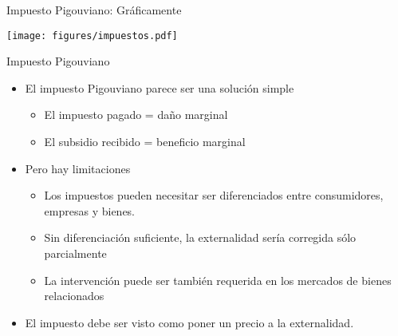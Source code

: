 \begin{frame}{Impuesto Pigouviano: Gráficamente}
	\begin{center}
		\texttt{[image: figures/impuestos.pdf]}
	\end{center}
\end{frame}
\begin{frame}{Impuesto Pigouviano}
	\begin{itemize}
		\item El impuesto Pigouviano parece ser una solución simple
				\begin{itemize}
					\item El impuesto pagado = daño marginal
					\item El subsidio recibido = beneficio marginal
				\end{itemize}
		\item Pero hay limitaciones
				\begin{itemize}
					\item Los impuestos pueden necesitar ser diferenciados entre consumidores, empresas y bienes.
					\item Sin diferenciación suficiente, la externalidad sería corregida sólo parcialmente
					\item La intervención puede ser también requerida en los mercados de bienes relacionados
				\end{itemize}
		\item El impuesto debe ser visto como poner un precio a la externalidad.
	\end{itemize}
\end{frame}